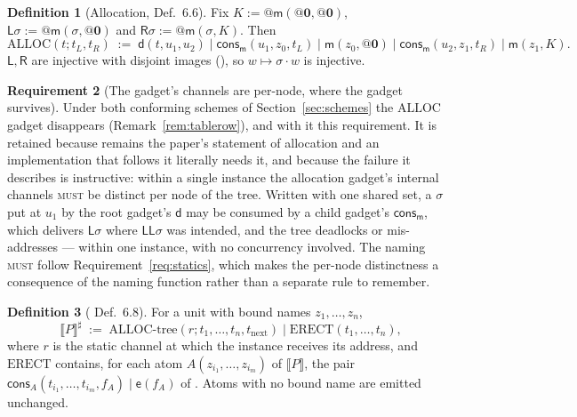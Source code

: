 \documentclass[11pt,a4paper]{article}
\makeatletter
\newcommand{\MUST}{\textsc{must}}
\newcommand{\quo}[1]{@#1}
\newcommand{\nil}{\mathbf{0}}
\newcommand{\enc}[1]{\llbracket #1 \rrbracket}
\newcommand{\mm}{\mathsf{m}}
\newcommand{\dd}{\mathsf{d}}
\newcommand{\ev}{\mathsf{e}}
\newcommand{\cons}{\mathsf{cons}}
\newcommand{\Lft}{\mathsf{L}}
\newcommand{\Rgt}{\mathsf{R}}
\newcommand{\ALLOC}{\mathrm{ALLOC}}
\newcommand{\ERECT}{\mathrm{ERECT}}
\theoremstyle{definition}
\newtheorem{definition}{Definition}[section]
\newtheorem{requirement}[definition]{Requirement}
\theoremstyle{plain}
\makeatother
\begin{document}
\begin{definition}[Allocation, \cite{draft3} Def.~6.6]\label{def:alloc}
Fix $K := \quo{\mm(\quo{\nil},\quo{\nil})}$,
$\Lft\sigma := \quo{\mm(\sigma,\quo{\nil})}$ and
$\Rgt\sigma := \quo{\mm(\sigma,K)}$. Then
\[
  \ALLOC(t;t_{L},t_{R}) \;:=\;
  \dd(t,u_{1},u_{2}) \mid \cons_{\mm}(u_{1},z_{0},t_{L}) \mid
  \mm(z_{0},\quo{\nil}) \mid \cons_{\mm}(u_{2},z_{1},t_{R}) \mid \mm(z_{1},K).
\]
$\Lft,\Rgt$ are injective with disjoint images
(\cite[Lem.~6.7]{draft3}), so $w \mapsto \sigma\!\cdot\!w$ is injective.
\end{definition}

\begin{requirement}[The gadget's channels are per-node, where the gadget
survives]\label{req:pergadget}
Under both conforming schemes of Section~\ref{sec:schemes} the $\ALLOC$ gadget
disappears (Remark~\ref{rem:tablerow}), and with it this requirement. It is
retained because \cite[Def.~6.6]{draft3} remains the paper's statement of
allocation and an implementation that follows it literally needs it, and
because the failure it describes is instructive: within a single instance the
allocation gadget's internal channels \MUST{} be distinct per node of the
tree. Written with one shared set, a $\sigma$ put at $u_{1}$ by the root
gadget's $\dd$ may be consumed by a child gadget's $\cons_{\mm}$, which
delivers $\Lft\sigma$ where $\Lft\Lft\sigma$ was intended, and the tree
deadlocks or mis-addresses --- within one instance, with no concurrency
involved. The naming \MUST{} follow Requirement~\ref{req:statics}, which makes
the per-node distinctness a consequence of the naming function rather than a
separate rule to remember.
\end{requirement}

\begin{definition}[\cite{draft3} Def.~6.8]\label{def:phase2}
For a unit with bound names $z_{1},\dots,z_{n}$,
\[
  \enc{P}^{\sharp} \;:=\;
  \text{ALLOC-tree}(r; t_{1},\dots,t_{n},t_{\mathrm{next}})
  \mid \ERECT(t_{1},\dots,t_{n}),
\]
where $r$ is the static channel at which the instance receives its address,
and $\ERECT$ contains, for each atom $A(z_{i_{1}},\dots,z_{i_{m}})$ of
$\enc{P}$, the pair $\cons_{A}(t_{i_{1}},\dots,t_{i_{m}},f_{A}) \mid \ev(f_{A})$
of \cite[Rem.~3.11]{draft3}. Atoms with no bound name are emitted unchanged.
\end{definition}
\end{document}
